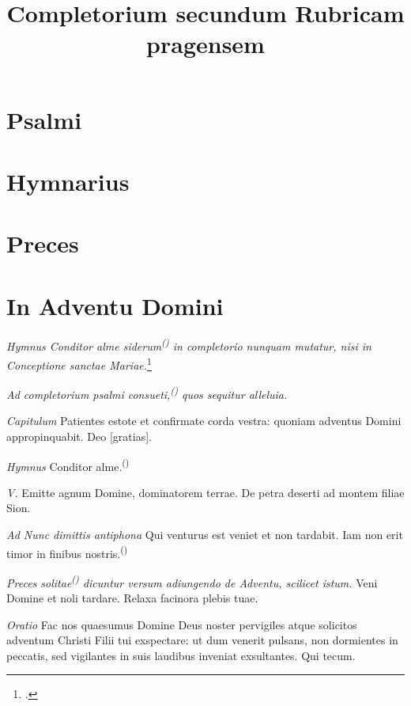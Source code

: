 \documentclass[a5paper, 12pt]{book}
\title{Completorium secundum Rubricam pragensem}
\newcommand{\rubrica}[1]{\textit{#1}}
\newcommand{\incipit}[1]{\textup{#1}}
\newcommand{\hymnus}[1]{%
  \phantomsection
  \label{hym:#1}
  }
\newcommand{\quickref}[1]{\quickrefFormat{\pageref{#1}}}
\newcommand{\quickrefFormat}[1]{\textsuperscript{\textup{(#1)}}}
\newcommand{\editorial}[1]{[#1]}
\begin{document}
\maketitle

\chapter{Psalmi}
\label{psalmi}

\chapter{Hymnarius}

\hymnus{conditor}

\chapter{Preces}
\label{preces}

\chapter{In Adventu Domini}

\rubrica{Hymnus \incipit{Conditor alme siderum}\quickref{hym:conditor}
  in completorio
  nunquam mutatur, nisi in Conceptione sanctae Mariae.}\footcite[83r]{bp1502}
\vspace{3mm}

\rubrica{Ad completorium psalmi consueti,\quickref{psalmi}
  quos sequitur \incipit{alleluia.}}

\rubrica{Capitulum}
Patientes estote et confirmate corda vestra:
quoniam adventus Domini appropinquabit.
Deo \editorial{gratias}.

\rubrica{Hymnus}
Conditor alme.\quickref{hym:conditor}

\rubrica{V.}
Emitte agnum Domine, dominatorem terrae.
De petra deserti ad montem filiae Sion.

\rubrica{Ad Nunc dimittis antiphona}
Qui venturus est veniet et non tardabit. Iam non erit timor in finibus nostris.\quickref{can:adventus_quiventurus}

\rubrica{Preces solitae\quickref{preces}
  dicuntur versum adiungendo de Adventu, scilicet istum.}
Veni Domine et noli tardare. Relaxa facinora plebis tuae.

\rubrica{Oratio}
Fac nos quaesumus Domine Deus noster pervigiles atque solicitos adventum
Christi Filii tui exspectare: ut dum venerit pulsans,
non dormientes in peccatis, sed vigilantes in suis laudibus inveniat
exsultantes. Qui tecum.
\end{document}
